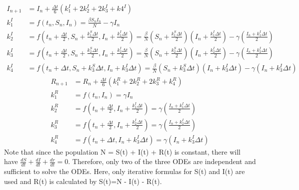 \documentclass[a4paper]{article}
\begin{document}
        \begin{equation}\label{RK4-SIR-2}
            \begin{split}
                I_{n+1} & = I_n + \frac{\Delta t}{6}(k_1^I+ 2k_2^I + 2k_3^I + k4^I) \\
                k_1^I & = f(t_n,S_n, I_n) = \frac{\beta S_n I_n}{N} - \gamma I_n \\
                k_2^I & = f(t_n + \frac{\Delta t}{2}, S_n + \frac{k_1^S \Delta t}{2}, I_n + \frac{k_1^I \Delta t}{2}) = \frac{\beta}{N} ( S_n + \frac{k_1^S \Delta t}{2})(I_n + \frac{k_1^I \Delta t}{2}) - \gamma (\frac{I_n + k_1^I \Delta t}{2})  \\
                k_3^I & = f(t_n + \frac{\Delta t}{2}, S_n + \frac{k_2^S \Delta t}{2}, I_n + \frac{k_2^I \Delta t}{2}) = \frac{\beta}{N} ( S_n + \frac{k_2^S \Delta t}{2})(I_n + \frac{k_2^I \Delta t}{2}) - \gamma (\frac{I_n + k_2^I \Delta t}{2})  \\
                k_4^I & = f(t_n + \Delta t, S_n + k_3^S \Delta t, I_n + k_3^I \Delta t) = \frac{\beta}{N} (S_n + k_3^S \Delta t)(I_n + k_3^I \Delta t) - \gamma (I_n + k_3^I \Delta t)
            \end{split}
        \end{equation}
        \begin{equation}\label{RK4-SIR-3}
            \begin{split}
                R_{n+1} & = R_n + \frac{\Delta t}{6}(k_1^R + 2k_2^R + 2k_3^R + k_4^R) \\
                k_1^R & = f(t_n, I_n) = \gamma I_n \\
                k_2^R & = f(t_n + \frac{\Delta t}{2}, I_n + \frac{k_1^I \Delta t}{2}) = \gamma (\frac{I_n + k_1^I \Delta t}{2})  \\
                k_3^R & = f(t_n + \frac{\Delta t}{2}, I_n + \frac{k_2^I \Delta t}{2}) = \gamma (\frac{I_n + k_2^I \Delta t}{2})  \\
                k_4^R & = f(t_n + \Delta t, I_n + k_3^I \Delta t) = \gamma (I_n + k_3^I \Delta t)
            \end{split}
        \end{equation}
        \indent Note that since the population N = S(t) + I(t) + R(t) is constant, there will have $\frac{dS}{dt} + \frac{dI}{dt} + \frac{dr}{dt} = 0$. Therefore, only two of the three ODEs are independent and sufficient to solve the ODEs. Here, only iterative formulas for S(t) and I(t) are used and R(t) is calculated by S(t)=N - I(t) - R(t).
        
\end{document}
